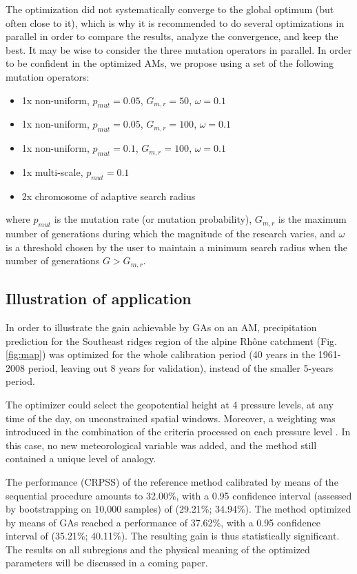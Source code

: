 \documentclass{ametsoc}
\begin{document}
The optimization did not systematically converge to the global optimum (but often close to it), which is why it is recommended to do several optimizations in parallel in order to compare the results, analyze the convergence, and keep the best. It may be wise to consider the three mutation operators in parallel. In order to be confident in the optimized AMs, we propose using a set of the following mutation operators:

\begin{itemize}
	\setlength\itemsep{-4px}
	\item 1x non-uniform, $p_{mut}=0.05$, $G_{m,r}=50$, $\omega=0.1$
	\item 1x non-uniform, $p_{mut}=0.05$, $G_{m,r}=100$, $\omega=0.1$
	\item 1x non-uniform, $p_{mut}=0.1$, $G_{m,r}=100$, $\omega=0.1$
	\item 1x multi-scale,  $p_{mut}=0.1$
	\item 2x chromosome of adaptive search radius
\end{itemize}

where $p_{mut}$ is the mutation rate (or mutation probability), $G_{m,r}$ is the maximum number of generations during which the magnitude of the research varies, and $\omega$ is a threshold chosen by the user to maintain a minimum search radius when the number of generations $G>G_{m,r}$.


\subsection{Illustration of application}

In order to illustrate the gain achievable by GAs on an AM, precipitation prediction for the Southeast ridges region of the alpine Rh\^{o}ne catchment (Fig. \ref{fig:map}) was optimized for the whole calibration period (40 years in the 1961-2008 period, leaving out 8 years for validation), instead of the smaller 5-years period.

The optimizer could select the geopotential height at 4 pressure levels, at any time of the day, on unconstrained spatial windows. Moreover, a weighting was introduced in the combination of the criteria processed on each pressure level \citep[such as][]{Horton2012a, Junk2015}. In this case, no new meteorological variable was added, and the method still contained a unique level of analogy.

The performance (CRPSS) of the reference method calibrated by means of the sequential procedure amounts to 32.00\%, with a 0.95 confidence interval (assessed by bootstrapping on 10,000 samples) of (29.21\%; 34.94\%). The method optimized by means of GAs reached a performance of 37.62\%, with a 0.95 confidence interval of (35.21\%; 40.11\%). The resulting gain is thus statistically significant. The results on all subregions and the physical meaning of the optimized parameters will be discussed in a coming paper.
\end{document}
